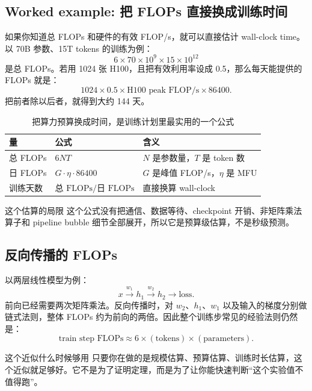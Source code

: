 \subsection{Worked example: 把 FLOPs 直接换成训练时间}

如果你知道总 FLOPs 和硬件的有效 FLOP/s，就可以直接估计 wall-clock time。以 70B 参数、15T tokens 的训练为例：
\[
6 \times 70\times 10^9 \times 15\times 10^{12}
\]
是总 FLOPs。若用 1024 张 H100，且把有效利用率设成 0.5，那么每天能提供的 FLOPs 就是：
\[
1024 \times 0.5 \times \text{H100 peak FLOP/s} \times 86400.
\]
把前者除以后者，就得到大约 144 天。

\begin{table}[H]
\centering
\begin{tabular}{p{}p{}p{}}
\toprule
\textbf{量} & \textbf{公式} & \textbf{含义} \\
\midrule
总 FLOPs & \(6NT\) & \(N\) 是参数量，\(T\) 是 token 数 \\
日 FLOPs & \(G \cdot \eta \cdot 86400\) & \(G\) 是峰值 FLOP/s，\(\eta\) 是 MFU \\
训练天数 & \(\text{总 FLOPs}/\text{日 FLOPs}\) & 直接换算 wall-clock \\
\bottomrule
\end{tabular}
\caption{把算力预算换成时间，是训练计划里最实用的一个公式}
\end{table}

\begin{warningbox}{这个估算的局限}
这个公式没有把通信、数据等待、checkpoint 开销、非矩阵乘法算子和 pipeline bubble 细节全部展开，所以它是预算级估算，不是秒级预测。
\end{warningbox}

\subsection{反向传播的 FLOPs}

以两层线性模型为例：
\[
x \xrightarrow{w_1} h_1 \xrightarrow{w_2} h_2 \rightarrow \text{loss}.
\]
前向已经需要两次矩阵乘法。反向传播时，对 \(w_2\)、\(h_1\)、\(w_1\) 以及输入的梯度分别做链式法则，整体 FLOPs 约为前向的两倍。因此整个训练步常见的经验法则仍然是：
\[
\text{train step FLOPs} \approx 6 \times (\text{tokens}) \times (\text{parameters}).
\]

\begin{importantbox}{这个近似什么时候够用}
只要你在做的是规模估算、预算估算、训练时长估算，这个近似就足够好。它不是为了证明定理，而是为了让你能快速判断“这个实验值不值得跑”。
\end{importantbox}

